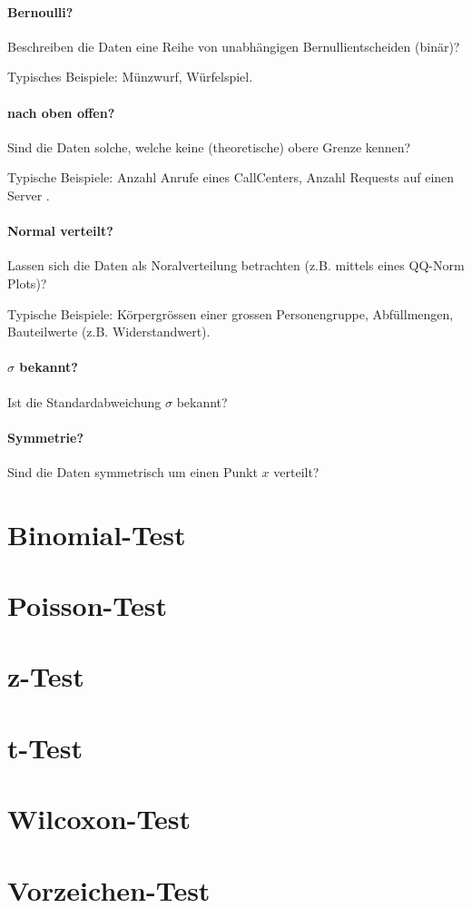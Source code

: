 \paragraph{Bernoulli?}
Beschreiben die Daten eine Reihe von unabhängigen 
Bernullientscheiden (binär)?

Typisches Beispiele: Münzwurf, Würfelspiel.

\paragraph{nach oben offen?}
Sind die Daten solche, welche keine (theoretische) obere Grenze kennen?

Typische Beispiele: Anzahl Anrufe eines CallCenters, Anzahl Requests auf 
einen Server .

\paragraph{Normal verteilt?}
Lassen sich die Daten als Noralverteilung betrachten 
(z.B. mittels eines QQ-Norm Plots)?

Typische Beispiele: Körpergrössen einer grossen Personengruppe,
Abfüllmengen, Bauteilwerte (z.B. Widerstandwert). 

\paragraph{$\sigma$ bekannt?}
Ist die Standardabweichung $\sigma$ bekannt?

\paragraph{Symmetrie?}
Sind die Daten symmetrisch um einen Punkt $x$ verteilt?


\newpage
\section{Binomial-Test}
\section{Poisson-Test}
\section{z-Test}
\section{t-Test}
\section{Wilcoxon-Test}
\section{Vorzeichen-Test}
